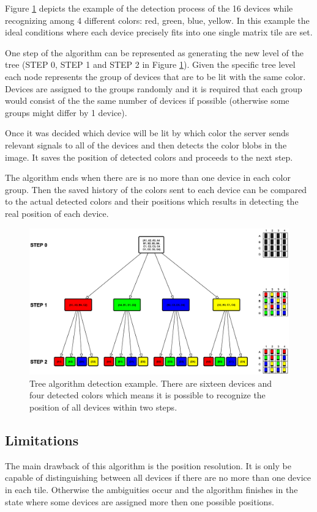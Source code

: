 Figure \ref{fig:sprint5_tree_alg} depicts the example of the detection process of the 16 devices while recognizing among 4 different colors: red, green, blue, yellow. In this example the ideal conditions where each device precisely fits into one single matrix tile are set. 

One step of the algorithm can be represented as generating the new level of the tree (STEP 0, STEP 1 and STEP 2 in Figure \ref{fig:sprint5_tree_alg}). Given the specific tree level each node represents the group of devices that are to be lit with the same color. Devices are assigned to the groups randomly and it is required that each group would consist of the the same number of devices if possible (otherwise some groups might differ by 1 device).

Once it was decided which device will be lit by which color the server sends relevant signals to all of the devices and then detects the color blobs in the image. It saves the position of detected colors and proceeds to the next step.

The algorithm ends when there are is no more than one device in each color group. Then the saved history of the colors sent to each device can be compared to the actual detected colors and their positions which results in detecting the real position of each device.

\begin{figure}[H]
	\centering
		\includegraphics[width=18cm, angle=90]{sprint5/tree_algorithm.eps}
	\caption[Tree algorithm detection example]{Tree algorithm detection example. There are sixteen devices and four detected colors which means it is possible to recognize the position of all devices within two steps.}
	\label{fig:sprint5_tree_alg}
\end{figure}

\subsection{Limitations}
The main drawback of this algorithm is the position resolution. It is only be capable of distinguishing between all devices if there are no more than one device in each tile. Otherwise the ambiguities occur and the algorithm finishes in the state where some devices are assigned more then one possible positions.

